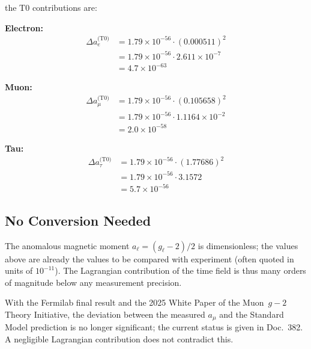 	the T0 contributions are:

	\textbf{Electron:}
	\begin{equation}
		\begin{split}
			\Delta a_e^{\text{(T0)}} &= 1.79 \times 10^{-56} \cdot (0.000511)^2 \\
			&= 1.79 \times 10^{-56} \cdot 2.611 \times 10^{-7} \\
			&= 4.7 \times 10^{-63}
		\end{split}
		\label{eq:electron_prediction}
	\end{equation}

	\textbf{Muon:}
	\begin{equation}
		\begin{split}
			\Delta a_\mu^{\text{(T0)}} &= 1.79 \times 10^{-56} \cdot (0.105658)^2 \\
			&= 1.79 \times 10^{-56} \cdot 1.1164 \times 10^{-2} \\
			&= 2.0 \times 10^{-58}
		\end{split}
		\label{eq:muon_prediction}
	\end{equation}

	\textbf{Tau:}
	\begin{equation}
		\begin{split}
			\Delta a_\tau^{\text{(T0)}} &= 1.79 \times 10^{-56} \cdot (1.77686)^2 \\
			&= 1.79 \times 10^{-56} \cdot 3.1572 \\
			&= 5.7 \times 10^{-56}
		\end{split}
		\label{eq:tau_prediction}
	\end{equation}

	\subsection{No Conversion Needed}

	The anomalous magnetic moment $a_\ell = (g_\ell - 2)/2$ is dimensionless; the values above are already the values to be compared with experiment (often quoted in units of $10^{-11}$). The Lagrangian contribution of the time field is thus many orders of magnitude below any measurement precision.

	With the Fermilab final result and the 2025 White Paper of the Muon~$g-2$ Theory Initiative, the deviation between the measured $a_\mu$ and the Standard Model prediction is no longer significant; the current status is given in Doc.~382. A negligible Lagrangian contribution does not contradict this.

